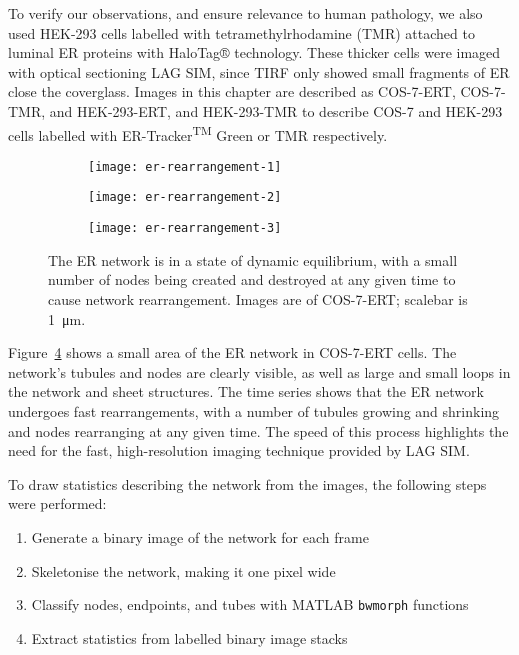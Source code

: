 To verify our observations, and ensure relevance to human pathology, we also used HEK-293 cells labelled with tetramethylrhodamine (TMR) attached to luminal ER proteins with HaloTag® technology. 
These thicker cells were imaged with optical sectioning LAG SIM, since TIRF only showed small fragments of ER close the coverglass. 
Images in this chapter are described as COS-7-ERT, COS-7-TMR, and HEK-293-ERT, and HEK-293-TMR to describe COS-7 and HEK-293 cells labelled with ER-Tracker\textsuperscript{TM} Green or TMR respectively. 

\begin{figure}[htbp!]
\centering
\begin{subfigure}[b]{0.325\textwidth}
	\texttt{[image: er-rearrangement-1]}
	\caption{}\label{fig:er-rearrangement-1}
\end{subfigure}\hfill
\begin{subfigure}[b]{0.325\textwidth}
	\texttt{[image: er-rearrangement-2]}
	\caption{}\label{fig:er-rearrangement-2}
\end{subfigure}\hfill
\begin{subfigure}[b]{0.325\textwidth}
	\texttt{[image: er-rearrangement-3]}
	\caption{}\label{fig:er-rearrangement-3}
\end{subfigure}
\caption[ER: Growing and shrinking tubules show the ER network is a state of dynamic equilibrium]{The ER network is in a state of dynamic equilibrium, with a small number of nodes being created and destroyed at any given time to cause network rearrangement. Images are of COS-7-ERT; scalebar is \SI{1}{\micro\metre}. } 
\label{fig:ER-rearrangement}
\end{figure}

Figure~\ref{fig:ER-rearrangement} shows a small area of the ER network in COS-7-ERT cells. 
The network's tubules and nodes are clearly visible, as well as large and small loops in the network and sheet structures. 
The time series shows that the ER network undergoes fast rearrangements, with a number of tubules growing and shrinking and nodes rearranging at any given time. 
The speed of this process highlights the need for the fast, high-resolution imaging technique provided by LAG SIM. 

To draw statistics describing the network from the images, the following steps were performed:
\begin{enumerate}
	\item Generate a binary image of the network for each frame
	\item Skeletonise the network, making it one pixel wide
	\item Classify nodes, endpoints, and tubes with MATLAB \texttt{bwmorph} functions
	\item Extract statistics from labelled binary image stacks
\end{enumerate}


